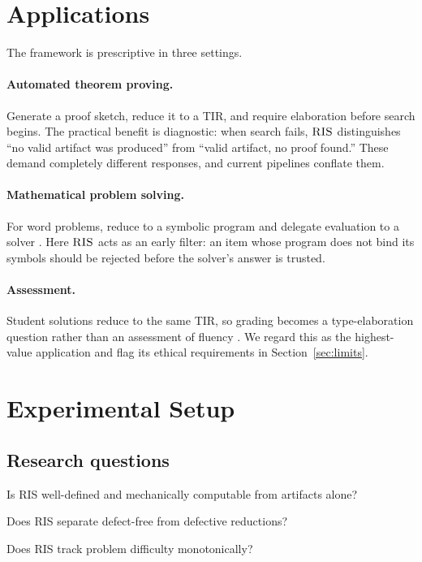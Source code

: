 \documentclass[11pt,a4paper]{article}
\theoremstyle{plain}
\theoremstyle{definition}
\newcommand{\RIS}{\textnormal{\textsc{RIS}}}
\begin{document}
\section{Applications}
\label{sec:apps}

The framework is prescriptive in three settings.

\paragraph{Automated theorem proving.} Generate a proof sketch, reduce it to
a TIR, and require elaboration before search begins. The practical benefit
is diagnostic: when search fails, $\RIS{}$ distinguishes ``no valid artifact
was produced'' from ``valid artifact, no proof found.'' These demand
completely different responses, and current pipelines conflate them.

\paragraph{Mathematical problem solving.} For word problems, reduce to a
symbolic program and delegate evaluation to a solver \citep{chen2022pot}.
Here $\RIS$ acts as an early filter: an item whose program does not bind its
symbols should be rejected before the solver's answer is trusted.

\paragraph{Assessment.} Student solutions reduce to the same TIR, so grading
becomes a type-elaboration question rather than an assessment of fluency
\citep{schick2023toolformer}. We regard this as the highest-value
application and flag its ethical requirements in Section~\ref{sec:limits}.

\section{Experimental Setup}
\label{sec:exp}

\subsection{Research questions}

\begin{description}[leftmargin=1.6em,labelsep=0.5em]
\item[RQ1] Is \RIS{} well-defined and mechanically computable from artifacts alone?
\item[RQ2] Does \RIS{} separate defect-free from defective reductions?
\item[RQ3] Does \RIS{} track problem difficulty monotonically?
\end{description}
\end{document}
